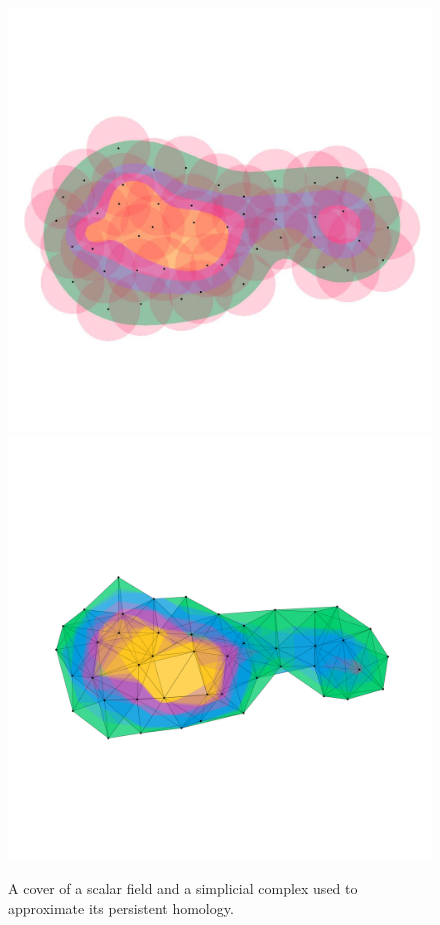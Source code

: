 \begin{figure}[htbp]
  \centering
  \includegraphics[trim=100 600 100 700, clip, width=0.4\linewidth]{figures/partial4/cover-comp.pdf}
  \includegraphics[trim=100 600 100 900, clip, width=0.4\linewidth]{figures/partial4/complex_nosurf.pdf}
  \caption{A cover of a scalar field and a simplicial complex used to approximate its persistent homology.}
\end{figure}
